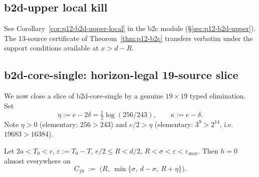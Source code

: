 \subsection{b2d-upper local kill}

See Corollary~\ref{cor:p12-b2d-upper-local} in the b2c module
(\S\ref{sec:p12-b2d-upper}).  The 13-source certificate of
Theorem~\ref{thm:p12-b2c} transfers verbatim under the support
conditions available at $x > d - R$.

\subsection{b2d-core-single: horizon-legal 19-source slice}
\label{sec:p12-b2d-core-single-slice}

We now close a slice of b2d-core-single by a genuine
$19 \times 19$ typed elimination.  Set
\[
\eta := e - 2\delta = \tfrac12 \log(256/243),
\qquad
\kappa := e - \delta.
\]
Note $\eta > 0$ (elementary: $256 > 243$) and $e/2 > \eta$
(elementary: $3^{9} > 2^{14}$, i.e.\ $19683 > 16384$).

\begin{theorem}
\label{thm:p12-b2d-core-single-slice}
Let $2a < T_{0} < c$, $\varepsilon := T_{0} - T$,
$e/2 \le R < d/2$, $R < \sigma < \varepsilon < \varepsilon_{\max}$.
Then $h = 0$ almost everywhere on
\[
C_{19} \;:=\; \bigl(R,\ \min\{\sigma,\ d - \sigma,\ R + \eta\}\bigr).
\]
\end{theorem}

